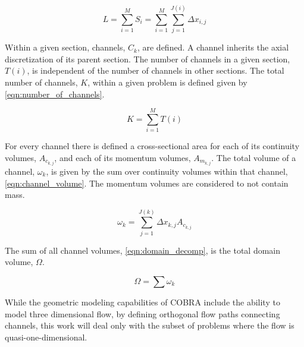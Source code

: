 \begin{equation}
\label{eqn:sections}
L = \sum_{i=1}^{M} S_i = \sum_{i=1}^{M}\sum_{j=1}^{J(i)} \Delta x_{i,j}
\end{equation}

Within a given section, channels, $C_{k}$, are defined.
A channel inherits the axial discretization of its parent section.
The number of channels in a given section, $T(i)$, is independent of the number of channels in other sections.
The total number of channels, $K$, within a given problem is defined given by \eqref{eqn:number_of_channels}.

\begin{equation}
\label{eqn:number_of_channels}
K = \sum_{i = 1}^{M} T(i)
\end{equation}

For every channel there is defined a cross-sectional area for each of its continuity volumes, $A_{c_{k,j}}$, and each of its momentum volumes, $A_{m_{k,j}}$.
The total volume of a channel, $\omega_k$, is given by the sum over continuity volumes within that channel, \eqref{eqn:channel_volume}.
The momentum volumes are considered to not contain mass.

\begin{equation}
\label{eqn:channel_volume}
\omega_k = \sum_{j = 1}^{J(k)} \Delta x_{k,j} A_{c_{k,j}}
\end{equation}

The sum of all channel volumes, \eqref{eqn:domain_decomp}, is the total domain volume, $\Omega$.

\begin{equation}
\label{eqn:domain_decomp}
\Omega = \sum \omega_{k}
\end{equation}

While the geometric modeling capabilities of COBRA include the ability to model three dimensional flow, by defining orthogonal flow paths connecting channels, this work will deal only with the subset of problems where the flow is quasi-one-dimensional.

